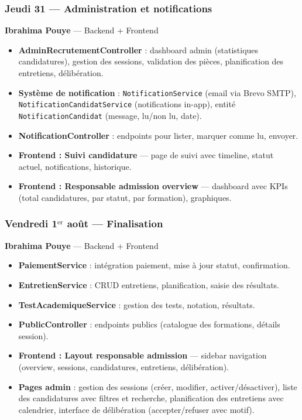 \documentclass[a4paper,12pt,french]{article}
\begin{document}
\subsubsection{Jeudi 31 — Administration et notifications}

\begin{assignmentbox}
\textbf{Ibrahima Pouye} — Backend + Frontend
\end{assignmentbox}

\begin{itemize}
    \item \textbf{AdminRecrutementController} : dashboard admin (statistiques candidatures), gestion des sessions, validation des pièces, planification des entretiens, délibération.
    \item \textbf{Système de notification} : \texttt{NotificationService} (email via Brevo SMTP), \texttt{NotificationCandidatService} (notifications in-app), entité \texttt{NotificationCandidat} (message, lu/non lu, date).
    \item \textbf{NotificationController} : endpoints pour lister, marquer comme lu, envoyer.
    \item \textbf{Frontend : Suivi candidature} — page de suivi avec timeline, statut actuel, notifications, historique.
    \item \textbf{Frontend : Responsable admission overview} — dashboard avec KPIs (total candidatures, par statut, par formation), graphiques.
\end{itemize}

\subsubsection{Vendredi 1$^\text{er}$ août — Finalisation}

\begin{assignmentbox}
\textbf{Ibrahima Pouye} — Backend + Frontend
\end{assignmentbox}

\begin{itemize}
    \item \textbf{PaiementService} : intégration paiement, mise à jour statut, confirmation.
    \item \textbf{EntretienService} : CRUD entretiens, planification, saisie des résultats.
    \item \textbf{TestAcademiqueService} : gestion des tests, notation, résultats.
    \item \textbf{PublicController} : endpoints publics (catalogue des formations, détails session).
    \item \textbf{Frontend : Layout responsable admission} — sidebar navigation (overview, sessions, candidatures, entretiens, délibération).
    \item \textbf{Pages admin} : gestion des sessions (créer, modifier, activer/désactiver), liste des candidatures avec filtres et recherche, planification des entretiens avec calendrier, interface de délibération (accepter/refuser avec motif).
\end{itemize}
\end{document}
